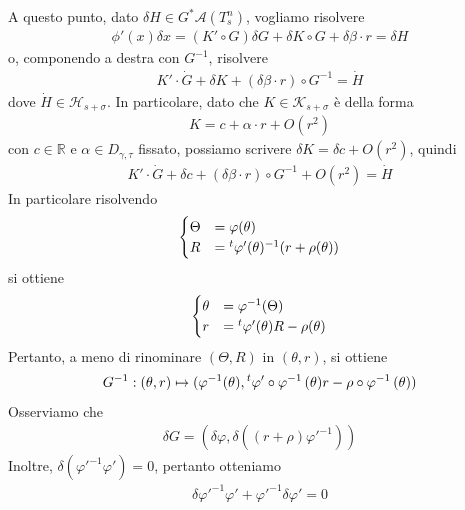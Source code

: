 \documentclass[twoside, 11pt]{amsbook}
\makeatletter
\newcommand{\0}{{(0)}}
\newcommand{\3}{{(3)}}
\theoremstyle{colonplain}
\theoremstyle{colondefinition}
\theoremstyle{colonremark}
\numberwithin{equation}{chapter}
\renewcommand{\proofname}{Dimostrazione}
\renewenvironment{proof}[1][\proofname]{\par
  \pushQED{\qed}%
  \normalfont \topsep6\p@\@plus6\p@\relax
  \trivlist
  \item[\hskip\labelsep\bfseries #1:]\ignorespaces
}{%
  \popQED\endtrivlist\@endpefalse
}
\makeatother
\begin{document}
\begin{proof}
A questo punto, dato $\delta H \in G^*\mathcal{A}(T^n_s)$, vogliamo risolvere
\begin{align}
    \phi'(x)\delta x = (K' \circ G)\delta G + \delta K \circ G + \delta\beta \cdot r = \delta H
\end{align}
o, componendo a destra con $G^{-1}$, risolvere
\begin{align}\label{LinEqDphi}
    K' \cdot \dot{G} + \delta K + (\delta\beta \cdot r) \circ G^{-1} = \dot{H}
\end{align}
dove $\dot{H} \in \mathcal{H}_{s + \sigma}$. In particolare, dato che $K \in \mathcal{K}_{s + \sigma}$ è della forma
\begin{align}
    K = c + \alpha \cdot r + O(r^2)
\end{align}
con $c \in \mathbb{R}$ e $\alpha \in D_{\gamma, \tau}$ fissato, possiamo scrivere $\delta K = \delta c + O(r^2)$, quindi
\begin{align}
    K' \cdot \dot{G} + \delta c + (\delta\beta \cdot r) \circ G^{-1} + O(r^2) = \dot{H}
\end{align}
In particolare risolvendo
\begin{align}
    \begin{cases}
        \Theta &= \varphi(\theta) \\
        R &= \null^t\varphi'(\theta)^{-1}(r + \rho(\theta))
    \end{cases}
\end{align}
si ottiene
\begin{align}
    \begin{cases}
        \theta &= \varphi^{-1}(\Theta) \\
        r &= \null^t\varphi'(\theta)R - \rho(\theta)
    \end{cases}
\end{align}
Pertanto, a meno di rinominare $(\Theta, R)$ in $(\theta, r)$, si ottiene
\begin{align}
    G^{-1} : (\theta, r) \mapsto (\varphi^{-1}(\theta), \null^t\varphi' \circ \varphi^{-1} \, (\theta)r - \rho \circ \varphi^{-1} \, (\theta))
\end{align}
Osserviamo che
\begin{align}\label{DeltaG}
    \delta G = (\delta \varphi, \delta((r + \rho)\varphi'^{-1}))
\end{align}
Inoltre, $\delta(\varphi'^{-1}\varphi') = 0$, pertanto otteniamo
\begin{align}
    \delta\varphi'^{-1}\varphi' + \varphi'^{-1}\delta\varphi' = 0
\end{align}

\end{proof}
\end{document}

